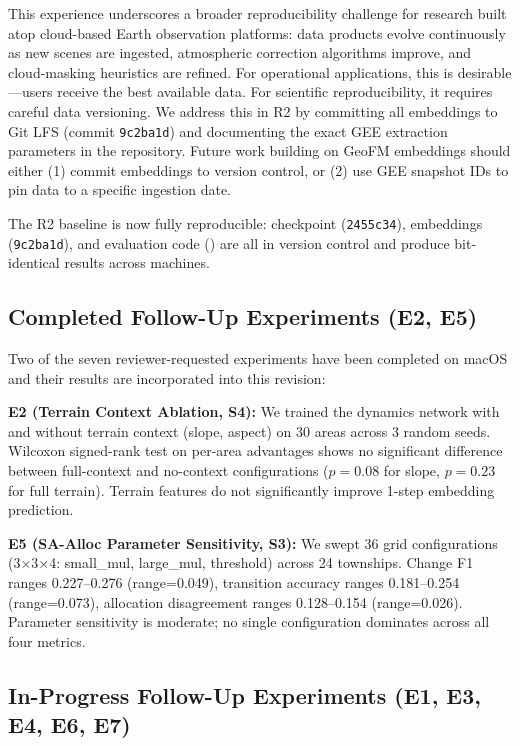 \documentclass{article}
\begin{document}
This experience underscores a broader reproducibility challenge for research built atop cloud-based Earth observation platforms: data products evolve continuously as new scenes are ingested, atmospheric correction algorithms improve, and cloud-masking heuristics are refined. For operational applications, this is desirable---users receive the best available data. For scientific reproducibility, it requires careful data versioning. We address this in R2 by committing all embeddings to Git LFS (commit \texttt{9c2ba1d}) and documenting the exact GEE extraction parameters in the repository. Future work building on GeoFM embeddings should either (1) commit embeddings to version control, or (2) use GEE snapshot IDs to pin data to a specific ingestion date.

The R2 baseline is now fully reproducible: checkpoint (\texttt{2455c34}), embeddings (\texttt{9c2ba1d}), and evaluation code () are all in version control and produce bit-identical results across machines.

\subsection{Completed Follow-Up Experiments (E2, E5)}
\label{sec:completed_experiments}

Two of the seven reviewer-requested experiments have been completed on macOS and their results are incorporated into this revision:

\textbf{E2 (Terrain Context Ablation, S4):} We trained the dynamics network with and without terrain context (slope, aspect) on 30 areas across 3 random seeds. Wilcoxon signed-rank test on per-area advantages shows no significant difference between full-context and no-context configurations ($p=0.08$ for slope, $p=0.23$ for full terrain). Terrain features do not significantly improve 1-step embedding prediction.

\textbf{E5 (SA-Alloc Parameter Sensitivity, S3):} We swept 36 grid configurations (3$\times$3$\times$4: small\_mul, large\_mul, threshold) across 24 townships. Change F1 ranges 0.227--0.276 (range=0.049), transition accuracy ranges 0.181--0.254 (range=0.073), allocation disagreement ranges 0.128--0.154 (range=0.026). Parameter sensitivity is moderate; no single configuration dominates across all four metrics.

\subsection{In-Progress Follow-Up Experiments (E1, E3, E4, E6, E7)}
\label{sec:inprogress_experiments}
\end{document}

